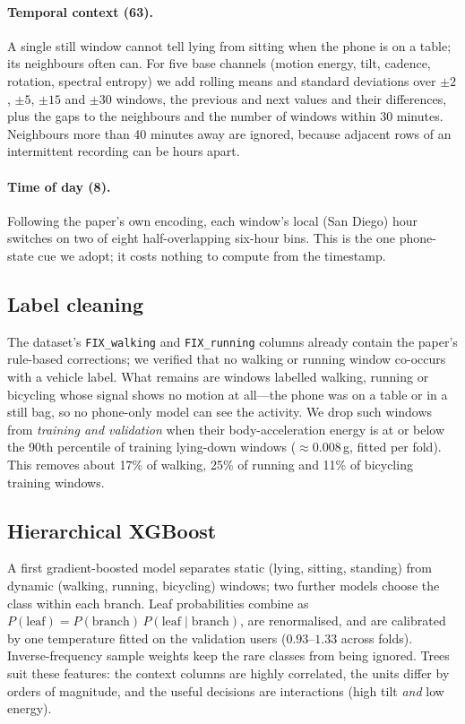 \documentclass[11pt,a4paper]{article}
\newcommand{\code}[1]{\texttt{\small #1}}
\begin{document}
\paragraph{Temporal context (63).} A single still window cannot tell lying from sitting
when the phone is on a table; its neighbours often can. For five base channels (motion
energy, tilt, cadence, rotation, spectral entropy) we add rolling means and standard
deviations over $\pm2$, $\pm5$, $\pm15$ and $\pm30$ windows, the previous and next values
and their differences, plus the gaps to the neighbours and the number of windows within
30 minutes. Neighbours more than 40 minutes away are ignored, because adjacent rows of an
intermittent recording can be hours apart.

\paragraph{Time of day (8).} Following the paper's own encoding, each window's local
(San Diego) hour switches on two of eight half-overlapping six-hour bins. This is the
one phone-state cue we adopt; it costs nothing to compute from the timestamp.

\subsection{Label cleaning}
\label{sec:cleaning}
The dataset's \code{FIX\_walking} and \code{FIX\_running} columns already contain the
paper's rule-based corrections; we verified that no walking or running window co-occurs
with a vehicle label. What remains are windows labelled walking, running or bicycling
whose signal shows no motion at all---the phone was on a table or in a still bag, so no
phone-only model can see the activity. We drop such windows from \emph{training and
validation} when their body-acceleration energy is at or below the 90th percentile of
training lying-down windows ($\approx0.008$\,g, fitted per fold). This removes about 17\%
of walking, 25\% of running and 11\% of bicycling training windows.

\subsection{Hierarchical XGBoost}
A first gradient-boosted model \cite{xgboost} separates static (lying, sitting, standing) from dynamic
(walking, running, bicycling) windows; two further models choose the class within each
branch. Leaf probabilities combine as
$P(\text{leaf}) = P(\text{branch})\,P(\text{leaf}\mid\text{branch})$, are renormalised,
and are calibrated by one temperature fitted on the validation users ($0.93$--$1.33$
across folds). Inverse-frequency sample weights keep the rare classes from being
ignored. Trees suit these features: the context columns are highly correlated, the units
differ by orders of magnitude, and the useful decisions are interactions (high tilt
\emph{and} low energy).
\end{document}
